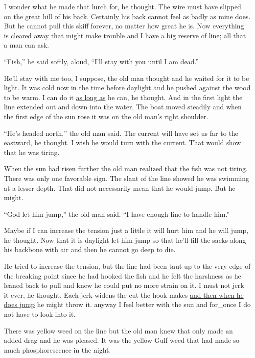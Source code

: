 I wonder what he made that \gls{lurch} for, he thought. The wire must have
slipped on the great hill of his back. Certainly his back cannot feel as
badly as mine does. But he cannot pull this skiff forever, no matter how
great he is. Now everything is cleared away that might make trouble and I
have a big reserve of line; all that a man can ask.

``Fish,'' he said softly, aloud, ``I'll stay with you until I am dead.''

He'll stay with me too, I \gls{suppose}, the old man thought and he waited for it
to be light. It was cold now in the time before daylight and he pushed
against the wood to be warm. I can do it \uline{as long as} he can, he thought. And
in the first light the line \gls{extended} out and down into the water. The boat
moved steadily and when the first edge of the sun rose it was on the old
man's right shoulder.

``He's headed north,'' the old man said. The current will have set us far to
the eastward, he thought. I wish he would turn with the current. That would
show that he was tiring.

When the sun had risen further the old man \gls{realized} that the fish was
not tiring. There was only one \gls{favorable} sign. The slant of the line
showed he was swimming at a lesser depth. That did not \gls{necessarily}
mean that he would jump. But he might.

``God let him jump,'' the old man said. ``I have enough line to \gls{handle}
him.''

Maybe if I can increase the tension just a little it will hurt him and he
will jump, he thought. Now that it is daylight let him jump so that he'll
fill the sacks along his \gls{backbone} with air and then he cannot go deep to
die.

He tried to increase the tension, but the line had been taut up to the very
edge of the breaking point since he had hooked the fish and he felt the
\gls{harshness} as he leaned back to pull and knew he could put no more
strain on it. I must not jerk it ever, he thought. Each jerk \glspl{widen}
the cut the hook makes \uline{and then when he does jump} he might throw it.
\Gls{anyway} I feel better with the sun and \gls{for_once} I do not have to look
into it.

There was yellow weed on the line but the old man knew that only made an
added \gls{drag} and he was pleased. It was the yellow Gulf weed that had
made so much phosphorescence in the night.

